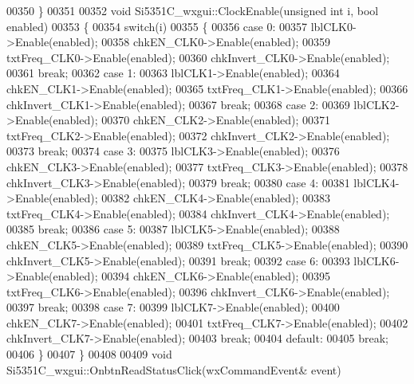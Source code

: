 \begin{DoxyCode}
00350 \}
00351 
00352 \textcolor{keywordtype}{void} Si5351C_wxgui::ClockEnable(\textcolor{keywordtype}{unsigned} \textcolor{keywordtype}{int} i, \textcolor{keywordtype}{bool} enabled)
00353 \{
00354     \textcolor{keywordflow}{switch}(i)
00355     \{
00356     \textcolor{keywordflow}{case} 0:
00357         lblCLK0->Enable(enabled);
00358         chkEN\_CLK0->Enable(enabled);
00359         txtFreq\_CLK0->Enable(enabled);
00360         chkInvert\_CLK0->Enable(enabled);
00361         \textcolor{keywordflow}{break};
00362     \textcolor{keywordflow}{case} 1:
00363         lblCLK1->Enable(enabled);
00364         chkEN\_CLK1->Enable(enabled);
00365         txtFreq\_CLK1->Enable(enabled);
00366         chkInvert\_CLK1->Enable(enabled);
00367         \textcolor{keywordflow}{break};
00368     \textcolor{keywordflow}{case} 2:
00369         lblCLK2->Enable(enabled);
00370         chkEN\_CLK2->Enable(enabled);
00371         txtFreq\_CLK2->Enable(enabled);
00372         chkInvert\_CLK2->Enable(enabled);
00373         \textcolor{keywordflow}{break};
00374     \textcolor{keywordflow}{case} 3:
00375         lblCLK3->Enable(enabled);
00376         chkEN\_CLK3->Enable(enabled);
00377         txtFreq\_CLK3->Enable(enabled);
00378         chkInvert\_CLK3->Enable(enabled);
00379         \textcolor{keywordflow}{break};
00380     \textcolor{keywordflow}{case} 4:
00381         lblCLK4->Enable(enabled);
00382         chkEN\_CLK4->Enable(enabled);
00383         txtFreq\_CLK4->Enable(enabled);
00384         chkInvert\_CLK4->Enable(enabled);
00385         \textcolor{keywordflow}{break};
00386     \textcolor{keywordflow}{case} 5:
00387         lblCLK5->Enable(enabled);
00388         chkEN\_CLK5->Enable(enabled);
00389         txtFreq\_CLK5->Enable(enabled);
00390         chkInvert\_CLK5->Enable(enabled);
00391         \textcolor{keywordflow}{break};
00392     \textcolor{keywordflow}{case} 6:
00393         lblCLK6->Enable(enabled);
00394         chkEN\_CLK6->Enable(enabled);
00395         txtFreq\_CLK6->Enable(enabled);
00396         chkInvert\_CLK6->Enable(enabled);
00397         \textcolor{keywordflow}{break};
00398     \textcolor{keywordflow}{case} 7:
00399         lblCLK7->Enable(enabled);
00400         chkEN\_CLK7->Enable(enabled);
00401         txtFreq\_CLK7->Enable(enabled);
00402         chkInvert\_CLK7->Enable(enabled);
00403         \textcolor{keywordflow}{break};
00404     \textcolor{keywordflow}{default}:
00405         \textcolor{keywordflow}{break};
00406     \}
00407 \}
00408 
00409 \textcolor{keywordtype}{void} Si5351C_wxgui::OnbtnReadStatusClick(wxCommandEvent& event)

\end{DoxyCode}
